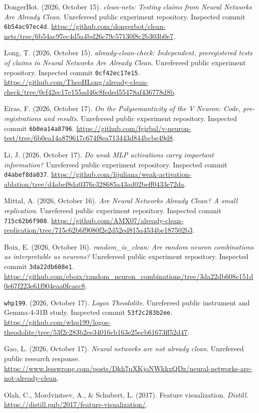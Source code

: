\documentclass[
  british,
  11pt,
  a4paper,
]{article}
\begin{document}
DongerBot. (2026, October 15). \emph{clean-nets: Testing claims from
Neural Networks Are Already Clean}. Unrefereed public experiment
repository. Inspected commit \texttt{6b54ac97ec4d}.
\url{https://github.com/dongerbot/clean-nets/tree/6b54ac97ec4d5a4bd26c79c57130f8c2b303b0e7}.

Long, T. (2026, October 15). \emph{already-clean-check: Independent,
preregistered tests of claims in Neural Networks Are Already Clean}.
Unrefereed public experiment repository. Inspected commit
\texttt{0cf42ec17e15}.
\url{https://github.com/TheoHLong/already-clean-check/tree/0cf42ec17e155ad46c8feded55478af436778d8b}.

Eiras, F. (2026, October 17). \emph{On the Polysemanticity of the V
Neuron: Code, pre-registrations and results}. Unrefereed public
experiment repository. Inspected commit \texttt{6b0ea14a8796}.
\url{https://github.com/fgirbal/v-neuron-test/tree/6b0ea14a879617c674f8ea713443d844bcbe49d8}.

Li, J. (2026, October 17). \emph{Do weak MLP activations carry important
information?} Unrefereed public experiment repository. Inspected commit
\texttt{d4abef8da037}.
\url{https://github.com/lijuliana/weak-activation-ablation/tree/d4abef8da0376c328685a43ad02beff0433e72da}.

Mittal, A. (2026, October 16). \emph{Are Neural Networks Already Clean?
A small replication}. Unrefereed public experiment repository. Inspected
commit \texttt{715c62b6f908}.
\url{https://github.com/AMX07/already-clean-replication/tree/715c62b6f9080f2e2d52ed815a4534be187502b3}.

Boix, E. (2026, October 16). \emph{random\_is\_clean: Are random neuron
combinations as interpretable as neurons?} Unrefereed public experiment
repository. Inspected commit \texttt{3da22db608e1}.
\url{https://github.com/eboix/random_neuron_combinations/tree/3da22db608e151d0e67f223e61f904eaa0fcaec8}.

\texttt{whp199}. (2026, October 17). \emph{Logos Theodolite}. Unrefereed
public instrument and Gemma-4-31B study. Inspected commit
\texttt{53f2c283b2ee}.
\url{https://github.com/whp199/logos-theodolite/tree/53f2c283b2ee34016cb163e25ecb61673ff52d47}.

Gao, L. (2026, October 17). \emph{Neural networks are not already
clean}. Unrefereed public research response.
\url{https://www.lesswrong.com/posts/Dkh7pXKjoNWkkxQDz/neural-networks-are-not-already-clean}.

Olah, C., Mordvintsev, A., \& Schubert, L. (2017). Feature
visualization. \emph{Distill}.
\url{https://distill.pub/2017/feature-visualization/}.
\end{document}
